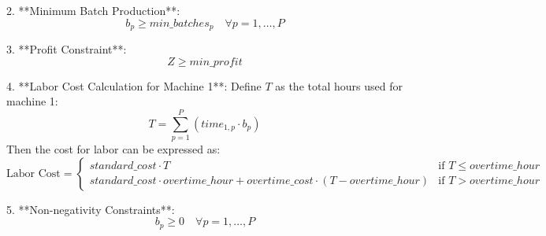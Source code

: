 \documentclass{article}
\begin{document}
2. **Minimum Batch Production**:
\[
b_p \geq min\_batches_p \quad \forall p = 1, \ldots, P
\]

3. **Profit Constraint**:
\[
Z \geq min\_profit
\]

4. **Labor Cost Calculation for Machine 1**:
Define \( T \) as the total hours used for machine 1:
\[
T = \sum_{p=1}^{P} (time_{1,p} \cdot b_p)
\]
Then the cost for labor can be expressed as:
\[
\text{Labor Cost} =
\begin{cases}
    standard\_cost \cdot T & \text{if } T \leq overtime\_hour \\
    standard\_cost \cdot overtime\_hour + overtime\_cost \cdot (T - overtime\_hour) & \text{if } T > overtime\_hour
\end{cases}
\]

5. **Non-negativity Constraints**:
\[
b_p \geq 0 \quad \forall p = 1, \ldots, P
\]
\end{document}
